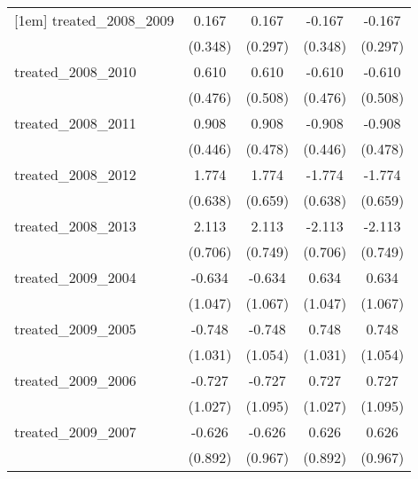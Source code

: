 {\begin{tabular}{l*{4}{c}}
[1em]
treated\_2008\_2009&       0.167         &       0.167         &      -0.167         &      -0.167         \\
            &     (0.348)         &     (0.297)         &     (0.348)         &     (0.297)         \\
[1em]
treated\_2008\_2010&       0.610         &       0.610         &      -0.610         &      -0.610         \\
            &     (0.476)         &     (0.508)         &     (0.476)         &     (0.508)         \\
[1em]
treated\_2008\_2011&       0.908\sym{*}  &       0.908         &      -0.908\sym{*}  &      -0.908         \\
            &     (0.446)         &     (0.478)         &     (0.446)         &     (0.478)         \\
[1em]
treated\_2008\_2012&       1.774\sym{**} &       1.774\sym{**} &      -1.774\sym{**} &      -1.774\sym{**} \\
            &     (0.638)         &     (0.659)         &     (0.638)         &     (0.659)         \\
[1em]
treated\_2008\_2013&       2.113\sym{**} &       2.113\sym{**} &      -2.113\sym{**} &      -2.113\sym{**} \\
            &     (0.706)         &     (0.749)         &     (0.706)         &     (0.749)         \\
[1em]
treated\_2009\_2004&      -0.634         &      -0.634         &       0.634         &       0.634         \\
            &     (1.047)         &     (1.067)         &     (1.047)         &     (1.067)         \\
[1em]
treated\_2009\_2005&      -0.748         &      -0.748         &       0.748         &       0.748         \\
            &     (1.031)         &     (1.054)         &     (1.031)         &     (1.054)         \\
[1em]
treated\_2009\_2006&      -0.727         &      -0.727         &       0.727         &       0.727         \\
            &     (1.027)         &     (1.095)         &     (1.027)         &     (1.095)         \\
[1em]
treated\_2009\_2007&      -0.626         &      -0.626         &       0.626         &       0.626         \\
            &     (0.892)         &     (0.967)         &     (0.892)         &     (0.967)         \\

\end{tabular}}
